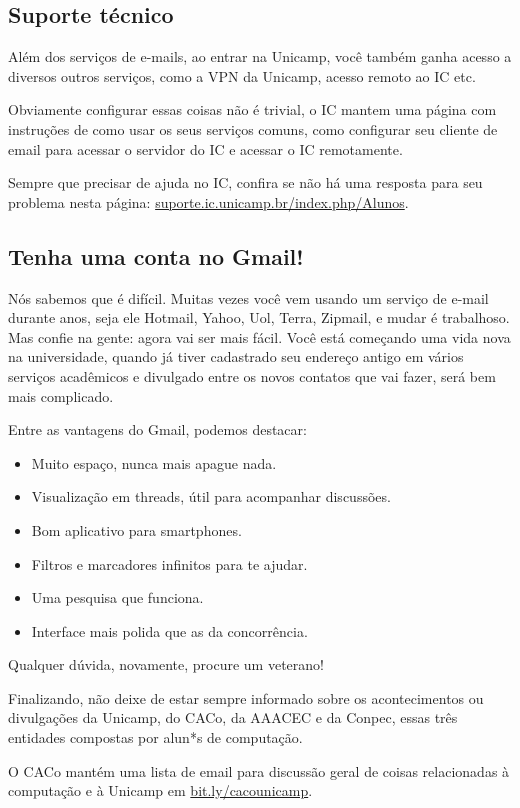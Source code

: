 \subsection{Suporte técnico}

Além dos serviços de e-mails, ao entrar na Unicamp, você também ganha acesso a
diversos outros serviços, como a VPN da Unicamp, acesso remoto ao IC etc.

Obviamente configurar essas coisas não é trivial, o IC mantem uma página com
instruções de como usar os seus serviços comuns, como configurar seu cliente de
email para acessar o servidor do IC e acessar o IC remotamente.

Sempre que precisar de ajuda no IC, confira se não há uma resposta para seu
problema nesta página: \url{suporte.ic.unicamp.br/index.php/Alunos}.


\subsection{Tenha uma conta no Gmail!}

Nós sabemos que é difícil. Muitas vezes você vem usando um serviço de e-mail
durante anos, seja ele Hotmail, Yahoo, Uol, Terra, Zipmail, e mudar é
trabalhoso.  Mas confie na gente: agora vai ser mais fácil. Você está começando
uma vida nova na universidade, quando já tiver cadastrado seu endereço antigo em
vários serviços acadêmicos e divulgado entre os novos contatos que vai fazer,
será bem mais complicado.

Entre as vantagens do Gmail, podemos destacar:

\begin{itemize}
    \item Muito espaço, nunca mais apague nada.
    \item Visualização em threads, útil para acompanhar discussões.
    \item Bom aplicativo para smartphones.
    \item Filtros e marcadores infinitos para te ajudar.
    \item Uma pesquisa que funciona.
    \item Interface mais polida que as da concorrência.
\end{itemize}

Qualquer dúvida, novamente, procure um veterano!

Finalizando, não deixe de estar sempre informado sobre os acontecimentos ou
divulgações da Unicamp, do CACo, da AAACEC e da Conpec, essas três entidades
compostas por alun*s de computação.

O CACo mantém uma lista de email para discussão geral de coisas relacionadas à
computação e à Unicamp em
\url{bit.ly/cacounicamp}.


